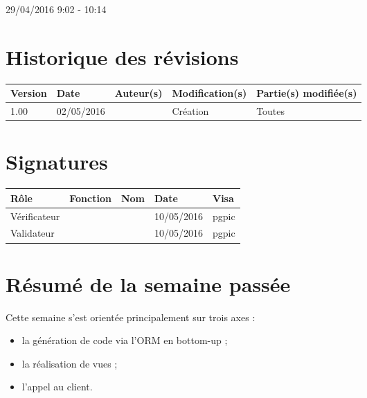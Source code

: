 \documentclass [a4paper] {article}
\begin{document}
29/04/2016			 				%
\hfill   
\hfill 	 9:02 - 10:14				%


\section*{Historique des révisions}
\begin{center}
			\begin{tabular}{| p{2.5cm} | p{3cm} | p{3cm} | p{3cm} | p{3.5cm} |}
				\hline
				\rowcolor{Gray}
				Version & Date & Auteur(s) & Modification(s) & Partie(s) modifiée(s)		 \\
				\hline
				1.00 & 02/05/2016 & \Pierre & Création & Toutes \\
		\hline		
			\end{tabular}
		\end{center}

\section*{Signatures}

		\begin{center}
			\begin{tabular}{| p{2.5cm} | p{4cm} | p{3cm} | p{3cm} | p{2.5cm} |}
				\hline
				\rowcolor{Gray}
				Rôle & Fonction & Nom & Date & Visa		 \\
				\hline
				Vérificateur & \RQA & \Kafui & 10/05/2016 & pgpic \\[30pt]
				\hline
				Validateur & \CP & \Sergi & 10/05/2016 & pgpic \\[30pt]	
				\hline
			\end{tabular}
		\end{center}


\section{Résumé de la semaine passée}
Cette semaine s'est orientée principalement sur trois axes : 
\begin{itemize}
\item la génération de code via l'ORM en bottom-up ;
\item la réalisation de vues ;
\item l'appel au client.
\end{itemize} 
\end{document}
